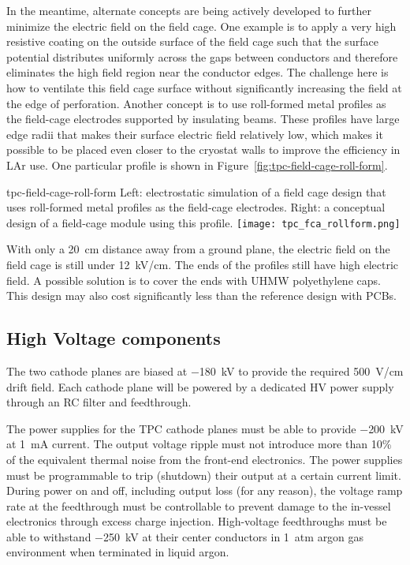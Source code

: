 In the meantime, alternate concepts are being actively developed to
further minimize the electric field on the field cage.  One example is
to apply a very high resistive coating on the outside surface of the
field cage such that the surface potential distributes uniformly
across the gaps between conductors and therefore eliminates the high field
region near the conductor edges.  The challenge here is how to
ventilate this field cage surface without significantly increasing the
field at the edge of perforation.  Another concept is to use
roll-formed metal profiles as the field-cage electrodes supported by
insulating beams.  These profiles have large edge radii that makes
their surface electric field relatively low, which makes it possible
to be placed even closer to the cryostat walls to improve the
efficiency in LAr use.  One particular profile is shown in
Figure~\ref{fig:tpc-field-cage-roll-form}.  
\begin{cdrfigure}{tpc-field-cage-roll-form}
{Left: electrostatic simulation of a field cage design that uses roll-formed 
metal profiles as the field-cage electrodes.  Right: a conceptual design of a 
field-cage module using this profile.}
\texttt{[image: tpc\_fca\_rollform.png]}
\end{cdrfigure}
With only a 20~cm distance
away from a ground plane, the electric field on the field cage is
still under 12~kV/cm.  The ends of the profiles still have high
electric field.  A possible solution is to cover the ends with UHMW
polyethylene caps.  This design may also cost significantly less than
the reference design with PCBs.



\subsection{High Voltage components}  
\label{subsec:fd-ref-hv}
   
The two cathode planes are biased at $-$180~kV to provide the required
500~V/cm drift field. Each cathode plane will be powered by a
dedicated HV power supply through an RC filter and feedthrough.

The power supplies for the TPC cathode planes must be able to provide
$-$200~kV at 1~mA current. The output voltage ripple must not
introduce more than 10\% of the equivalent thermal noise from the
front-end electronics.  The power supplies must be programmable to
trip (shutdown) their output at a certain current limit.  During power
on and off, including output loss (for any reason), the voltage ramp
rate at the feedthrough must be controllable to prevent damage to the
in-vessel electronics through excess charge injection.  High-voltage
feedthroughs must be able to withstand $-$250~kV at their center
conductors in 1~atm argon gas environment when terminated in liquid
argon.


